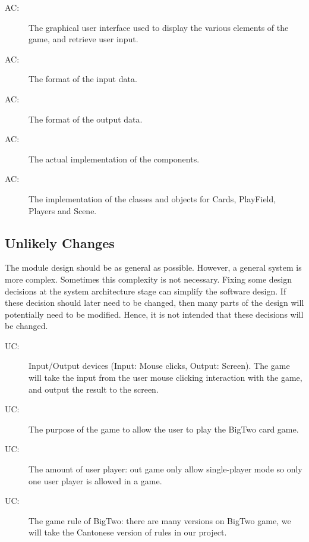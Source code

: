 \documentclass[12pt, titlepage]{article}
\newcounter{acnum}
\newcommand{\actheacnum}{AC\theacnum}
\newcounter{ucnum}
\newcommand{\uctheucnum}{UC\theucnum}
\begin{document}
\begin{description}
\item[ \actheacnum \label{acInterface}:] The graphical user interface used to display the various elements of the game, and retrieve user input.
\item[ \actheacnum \label{acInput}:] The format of the
input data.
\item[ \actheacnum \label{acOutput}:] The format of the
output data.
\item[ \actheacnum \label{acLibrary}:] The actual implementation of the components.
\item[ \actheacnum \label{acImplementation}:] The implementation of the classes and objects for Cards, PlayField, Players and Scene.

\end{description}

\subsection{Unlikely Changes} \label{SecUchange}

The module design should be as general as possible. However, a general system is
more complex. Sometimes this complexity is not necessary. Fixing some design
decisions at the system architecture stage can simplify the software design. If
these decision should later need to be changed, then many parts of the design
will potentially need to be modified. Hence, it is not intended that these
decisions will be changed.

\begin{description}
\item[ \uctheucnum \label{ucIO}:] Input/Output devices
  (Input: Mouse clicks, Output: Screen). The game will take the input from the user mouse clicking interaction with the game, and output the result to the screen.
\item[ \uctheucnum \label{ucPurpose}:] The purpose of the game to allow the user to play the BigTwo card game.
\item[ \uctheucnum \label{ucUser}:] The amount of user player: out game only allow single-player mode so only one user player is allowed in a game.
\item[ \uctheucnum \label{ucRule}:] The game rule of BigTwo: there are many versions on BigTwo game, we will take the Cantonese version of rules in our project.
\end{description}
\end{document}
